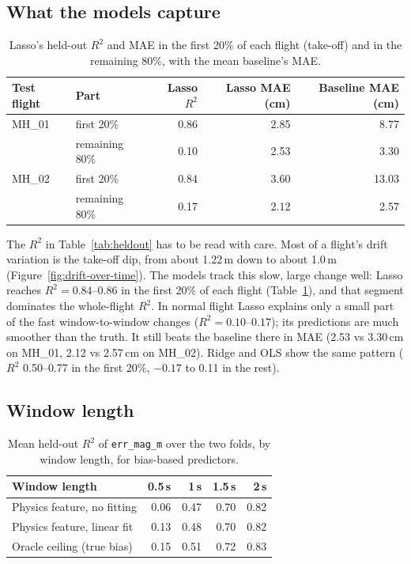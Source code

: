 \subsection{What the models capture}
\label{sec:segments}

\begin{table}[htbp]
\centering
\caption{Lasso's held-out $R^2$ and MAE in the first 20\% of each flight
(take-off) and in the remaining 80\%, with the mean baseline's MAE.}
\label{tab:segments}
\begin{tabular}{llrrr}
\hline
Test flight & Part & Lasso $R^2$ & Lasso MAE (cm) & Baseline MAE (cm) \\
\hline
MH\_01 & first 20\% & 0.86 & 2.85 & 8.77 \\
       & remaining 80\% & 0.10 & 2.53 & 3.30 \\
MH\_02 & first 20\% & 0.84 & 3.60 & 13.03 \\
       & remaining 80\% & 0.17 & 2.12 & 2.57 \\
\hline
\end{tabular}
\end{table}

The $R^2$ in Table~\ref{tab:heldout} has to be read with care. Most of a
flight's drift variation is the take-off dip, from about 1.22\,m down to about
1.0\,m (Figure~\ref{fig:drift-over-time}). The models track this slow, large
change well: Lasso reaches $R^2 = 0.84$--$0.86$ in the first 20\% of each
flight (Table~\ref{tab:segments}), and that segment dominates the whole-flight
$R^2$. In normal flight Lasso explains only a small part of the fast
window-to-window changes ($R^2 = 0.10$--$0.17$); its predictions are much
smoother than the truth. It still beats the baseline there in MAE (2.53 vs
3.30\,cm on MH\_01, 2.12 vs 2.57\,cm on MH\_02). Ridge and OLS show the same
pattern ($R^2$ 0.50--0.77 in the first 20\%, $-0.17$ to 0.11 in the rest).

\subsection{Window length}
\label{sec:window-length}

\begin{table}[htbp]
\centering
\caption{Mean held-out $R^2$ of \texttt{err\_mag\_m} over the two folds, by
window length, for bias-based predictors.}
\label{tab:window-length}
\begin{tabular}{lrrrr}
\hline
Window length & 0.5\,s & 1\,s & 1.5\,s & 2\,s \\
\hline
Physics feature, no fitting & 0.06 & 0.47 & 0.70 & 0.82 \\
Physics feature, linear fit & 0.13 & 0.48 & 0.70 & 0.82 \\
Oracle ceiling (true bias)  & 0.15 & 0.51 & 0.72 & 0.83 \\
\hline
\end{tabular}
\end{table}

